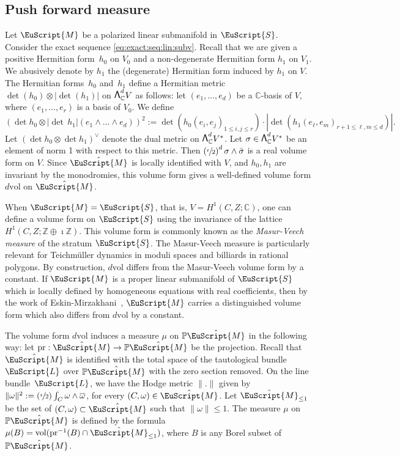 \documentclass[JEP,XML,SOM,Unicode]{cedram}
\let\mathcal\EuScript
\newcommand\bw{{\hbox{\large$\mathsf{\Lambda}$}}}
\newcommand{\Psfrac}[2]{(\sfrac{#1}{#2})}
\theoremstyle{plain}
\theoremstyle{definition}
\def\C{\mathbb{C}}
\newcommand\Z{\mathbb{Z}}
\newcommand{\Pb}{\mathbb{P}}
\newcommand{\cL}{\mathcal{L}}
\newcommand{\cM}{\mathcal{M}}
\newcommand{\cS}{\mathcal{S}}
\newcommand{\vol}{\mathrm{vol}}
\newcommand{\pr}{\mathrm{pr}}
\let\omg\omega
\let\ol\overline
\begin{document}
\subsection{Push forward measure}\label{sec:push:measure}
Let $\cM$ be a polarized linear submanifold in $\cS$.
Consider the exact sequence \eqref{eq:exact:seq:lin:subv}.
Recall that we are given a positive Hermitian form~$h_0$ on $V_0$ and a non-degenerate Hermitian form $h_1$ on $V_1$. We abusively denote by $h_1$ the (degenerate) Hermitian form induced by $h_1$ on $V$.
The Hermitian forms~$h_0$ and~$h_1$ define a Hermitian metric $\det(h_0)\otimes|{\det}(h_1)|$ on $\bw^d_\C V$ as follows: let $(e_1,\dots,e_d)$ be a $\C$-basis of $V$, where $(e_1,\dots,e_r)$ is a basis of $V_0$. We define
\[
(\det h_0\otimes|{\det\,} h_1|(e_1\wedge\dots\wedge e_d))^2:=\det(h_0(e_i,e_j)_{1\leq i,j\leq r})\cdot|{\det}(h_1(e_\ell,e_m)_{r+1\leq \ell,m\leq d})|.
\]
Let $(\det h_0\otimes \det h_1)^\vee$ denote the dual metric on $\bw^d_\C V^*$.
Let $\sigma \in \bw^d_\C V^*$ be an element of norm 1 with respect to this metric.
Then $\left(\sfrac{\imath}{2}\right)^d\sigma\wedge\bar{\sigma}$ is a real volume form on $V$.
Since $\hat{\cM}$ is locally identified with $V$, and $h_0,h_1$ are invariant by the monodromies, this volume form gives a well-defined volume form $d\vol$ on $\hat{\cM}$.

When $\cM=\cS$, that is, $V=H^1(C,Z;\C)$, one can define a volume form on $\cS$ using the invariance of the lattice $H^1(C,Z;\Z\oplus\imath\Z)$.
This volume form is commonly known as the \emph{Masur-Veech measure} of the stratum $\cS$.
The Masur-Veech measure is particularly relevant for Teichmüller dynamics in moduli spaces and billiards in rational polygons.
By construction, $d\vol$ differs from the Masur-Veech volume form by a constant.
If $\cM$ is a proper linear submanifold of $\cS$ which is locally defined by homogeneous equations with real coefficients, then by the work of Eskin-Mirzakhani~\cite{EM18}, $\cM$ carries a distinguished volume form which also differs from $d\vol$ by a constant.

The volume form $d\vol$ induces a measure $\mu$ on $\Pb\hat\cM$ in the following way: let $\pr:\hat\cM\to\Pb\hat\cM$ be the projection.
Recall that $\hat\cM$ is identified with the total space of the tautological bundle $\cL$ over $\Pb\hat\cM$ with the zero section removed. On the line bundle~$\cL$, we have the Hodge metric $\|.\|$ given by $ \|\omg\|^2:=\Psfrac{\imath}{2}\int_C\omg\wedge\ol{\omg}$, for every $(C,\omg) \in \hat{\cM}$.
Let $\hat\cM_{\leq 1}$ be the set of $(C,\omg) \subset\hat\cM$ such that $\|\omg\| \leq 1$.
The measure $\mu$ on $\Pb\hat\cM$ is defined by the formula $\mu(B)=\vol(\pr^{-1}(B)\cap \hat\cM_{\leq 1})$, where $B$ is any Borel subset of~$\Pb\hat\cM$.
\end{document}
